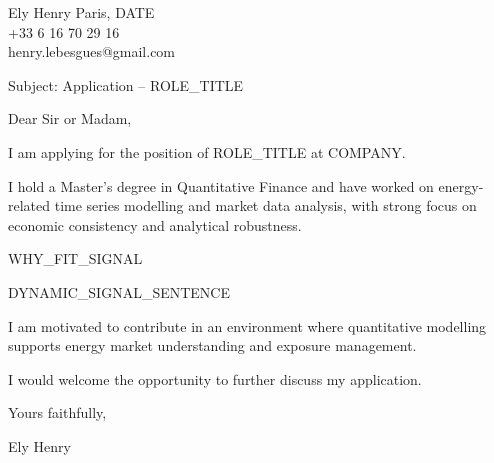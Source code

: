 \documentclass[10pt,a4paper]{article}
\begin{document}
\noindent Ely Henry \hfill Paris, {{DATE}} \\
+33 6 16 70 29 16 \\
henry.lebesgues@gmail.com \\

\vspace{1cm}

\noindent Subject: Application – {{ROLE_TITLE}}

\vspace{0.5cm}

Dear Sir or Madam,

\vspace{0.5cm}

I am applying for the position of {{ROLE_TITLE}} at {{COMPANY}}. 

I hold a Master’s degree in Quantitative Finance and have worked on energy-related time series modelling and market data analysis, with strong focus on economic consistency and analytical robustness.

{{WHY_FIT_SIGNAL}}

{{DYNAMIC_SIGNAL_SENTENCE}}

I am motivated to contribute in an environment where quantitative modelling supports energy market understanding and exposure management.

I would welcome the opportunity to further discuss my application.

Yours faithfully,

\vspace{1cm}

\noindent Ely Henry
\end{document}
